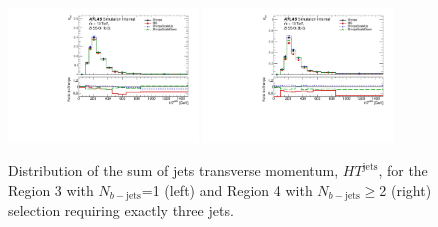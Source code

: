 \begin{figure}[!htb]
\centering
\includegraphics[width=0.45\textwidth]{Plots/ttV/generator/c_Region_2_HT_jets}
\includegraphics[width=0.45\textwidth]{Plots/ttV/generator/c_Region_3_HT_jets}\\
  \caption{Distribution of the sum of jets transverse momentum, $HT^{\text{jets}}$, for the Region 3 with $N_{b-\mathrm{jets}}$=1 (left) and Region 4 with $N_{b-\mathrm{jets}}\geq$2 (right) selection requiring exactly three jets.  \label{ttV:den_3j12b}}
\end{figure}


